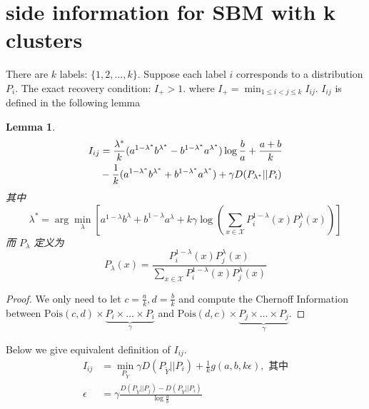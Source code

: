 \documentclass{ctexart}
\newtheorem{lemma}{Lemma}
\begin{document}
\section{side information for SBM with k clusters}
There are $k$ labels: $\{1,2,\dots, k\}$.
Suppose each label $i$ corresponds to a distribution $P_i$.
The exact recovery condition: $I_+>1$.
where $I_+ = \min_{1\leq i < j \leq k} I_{ij}$.
$I_{ij}$ is defined in the following lemma
\begin{lemma}\label{lem:I_plus_expression}
	\begin{align}\label{equation:I+}
		I_{ij} &=\frac{\lambda^* }{k} (a^{1-\lambda^* }b^{\lambda^* } -
		b^{1-\lambda^* }a^{\lambda^* })\log\frac{b}{a}+\frac{a+b}{k}\notag \\
		&-\frac{1}{k}(a^{1-\lambda^*}b^{\lambda^*} +
		b^{1-\lambda^* }a^{\lambda^* })+\gamma D(P_{\lambda^* }||P_i) 
		\end{align}
		其中
		\begin{equation}\label{eq:lambda}
		\lambda^* = \arg\min_{\lambda} \left[a^{1-\lambda}b^{\lambda} +
		b^{1-\lambda}a^{\lambda} + k\gamma \log
		\left(\sum_{x\in \mathcal{X}}P^{1-\lambda}_i(x) P^{\lambda}_j(x)
		\right)
		\right]
	\end{equation}
	而 $P_{\lambda}$ 定义为
	\begin{equation}\label{eq:P_lambda_0_1}
		P_{\lambda}(x) = \frac{P_i^{1-\lambda}(x) P_j^{\lambda} (x)}
		{\sum_{x \in \mathcal{X}}P_i^{1-\lambda}(x) P_j^{\lambda} (x)}        
	\end{equation}
	
	\end{lemma}
	\begin{proof}
		We only need to let $c=\frac{a}{k}, d=\frac{b}{k}$ and
		compute the Chernoff Information between
		$\textrm{Pois}(c,d)\times \underbrace{P_i \times \dots \times P_i}_{\gamma}$
    and $\textrm{Pois}(d, c)\times \underbrace{P_j \times \dots \times P_j}_{\gamma}$.
	\end{proof}
	Below we give equivalent definition of $I_{ij}$.
	\begin{align}
		I_{ij} &=\min_{P_{\widetilde{Y}}}
		\gamma D(P_{\widetilde{Y}}|| P_i)
		+ \frac{1}{k} g(a,b, k\epsilon),
		\text{ 其中}\nonumber\\
		\epsilon &= \gamma \frac{D(P_{\widetilde{Y}} || P_j) - D(P_{\widetilde{Y}} || P_i) }{\log \frac{a}{b}}
   	\end{align}
\end{document}
